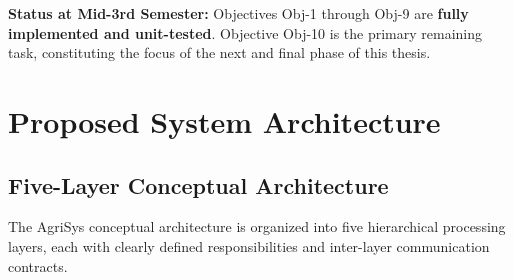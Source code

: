 \documentclass[12pt,a4paper]{article}
\begin{document}
\textbf{Status at Mid-3rd Semester:} Objectives Obj-1 through Obj-9 are \textbf{fully implemented and unit-tested}. Objective Obj-10 is the primary remaining task, constituting the focus of the next and final phase of this thesis.


\clearpage
\section{Proposed System Architecture}

\subsection{Five-Layer Conceptual Architecture}

The AgriSys conceptual architecture is organized into five hierarchical processing layers, each with clearly defined responsibilities and inter-layer communication contracts.
\end{document}
